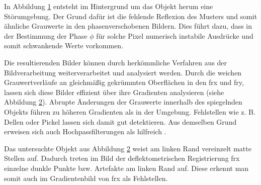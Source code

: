 {
	\begin{figure}[H]
		\centering
		
		\label{tikz:abbRegistrierungDelle}
	\end{figure}
}

\noindent
In Abbildung \ref{tikz:abbRegistrierungDelle} entsteht im Hintergrund um das Objekt herum eine Störumgebung.
Der Grund dafür ist die fehlende Reflexion des Musters und somit ähnliche Grauwerte in den phasenverschobenen Bildern.
Dies führt dazu, dass in der Bestimmung der Phase $\phi$ für solche Pixel numerisch instabile Ausdrücke und somit schwankende Werte vorkommen.

\p
Die resultierenden Bilder können durch herkömmliche Verfahren aus der Bildverarbeitung weiterverarbeitet und analysiert werden.
Durch die weichen Grauwertverläufe an gleichmäßig gekrümmten Oberflächen in den \acrshort{frx} und \acrshort{fry}, lassen sich diese Bilder effizient über ihre Gradienten analysieren (siehe Abbildung \ref{tikz:abbGradientenbildReg}).
Abrupte Änderungen der Grauwerte innerhalb des spiegelnden Objekts führen zu höheren Gradienten als in der Umgebung. Fehlstellen wie z. B. Dellen oder Pickel lassen sich damit gut detektieren.
Aus demselben Grund erweisen sich auch Hochpassfilterungen als hilfreich \cite{kit_werling}.

{
	\begin{figure}[H]
		\centering
		
		\label{tikz:abbGradientenbildReg}
	\end{figure}
}

\noindent
Das untersuchte Objekt aus Abbildung \ref{tikz:abbGradientenbildReg} weist am linken Rand vereinzelt matte Stellen auf.
Dadurch treten im Bild der deflektometrischen Registrierung \acrshort{frx} einzelne dunkle Punkte bzw. Artefakte am linken Rand auf.
Diese erkennt man somit auch im Gradientenbild von \acrshort{frx} als Fehlstellen.

